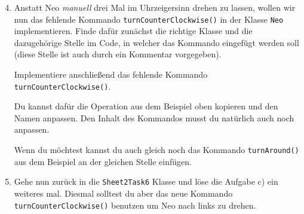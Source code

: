 \begin{enumerate} \setcounter{enumi}{3}
    \item Anstatt Neo \textit{manuell} drei Mal im Uhrzeigersinn drehen zu lassen, wollen wir nun das fehlende Kommando \lstinline{turnCounterClockwise()} in der Klasse \lstinline{Neo} implementieren. 
        Finde dafür zunächst die richtige Klasse und die dazugehörige Stelle im Code, in welcher das Kommando eingefügt werden soll (diese Stelle ist auch durch ein Kommentar vorgegeben).

        Implementiere anschließend das fehlende Kommando \lstinline{turnCounterClockwise()}.
        
        Du kannst dafür die Operation aus dem Beispiel oben kopieren und den Namen anpassen.
        Den Inhalt des Kommandos musst du natürlich auch noch anpassen.

        Wenn du möchtest kannst du auch gleich noch das Kommando \lstinline{turnAround()} aus dem Beispiel an der gleichen Stelle einfügen.

    \item Gehe nun zurück in die \lstinline{Sheet2Task6} Klasse und löse die Aufgabe c) ein weiteres mal.
        Diesmal solltest du aber das neue Kommando \lstinline{turnCounterClockwise()} benutzen um Neo nach links zu drehen.
\end{enumerate}


